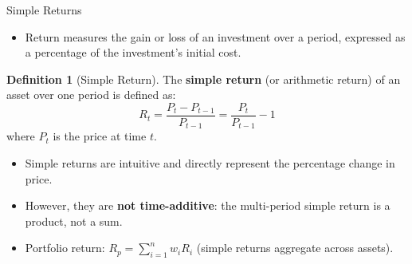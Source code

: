 \documentclass[9pt, aspectratio=169, t]{beamer}
\theoremstyle{definition}
\newtheorem{defn}{Definition}
\begin{document}
\begin{frame}{Simple Returns}

\begin{itemize}
    \item Return measures the gain or loss of an investment over a period, expressed as a percentage of the investment's initial cost.
\end{itemize}

\vspace{0.3cm}

\begin{defn}[Simple Return]
The \textbf{simple return} (or arithmetic return) of an asset over one period is defined as:
\[
R_t = \frac{P_t - P_{t-1}}{P_{t-1}} = \frac{P_t}{P_{t-1}} - 1
\]
where $P_t$ is the price at time $t$.
\end{defn}

\vspace{0.3cm}

\begin{itemize}
    \item Simple returns are intuitive and directly represent the percentage change in price.
    \item However, they are \textbf{not time-additive}: the multi-period simple return is a product, not a sum.
    \item Portfolio return: $R_p = \sum_{i=1}^{n} w_i R_i$ (simple returns aggregate across assets).
\end{itemize}

\end{frame}
\end{document}
